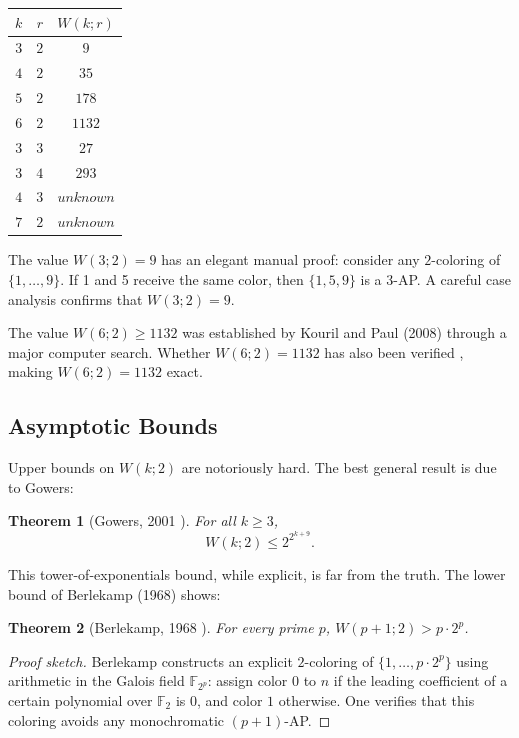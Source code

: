 \documentclass[12pt,a4paper]{amsart}
\newtheorem{theorem}{Theorem}[section]
\theoremstyle{definition}
\begin{document}
\begin{center}
\begin{tabular}{ccc}
\toprule
$k$ & $r$ & $W(k; r)$ \\
\midrule
$3$ & $2$ & $9$ \\
$4$ & $2$ & $35$ \\
$5$ & $2$ & $178$ \\
$6$ & $2$ & $1132$ \\
$3$ & $3$ & $27$ \\
$3$ & $4$ & $293$ \\
$4$ & $3$ & $unknown$ \\
$7$ & $2$ & $unknown$ \\
\bottomrule
\end{tabular}
\end{center}

The value $W(3;2)=9$ has an elegant manual proof: consider any $2$-coloring of
$\{1,\ldots,9\}$. If 1 and 5 receive the same color, then $\{1,5,9\}$ is a
$3$-AP. A careful case analysis confirms that $W(3;2) = 9$.

The value $W(6;2) \geq 1132$ was established by Kouril and Paul (2008) through a
major computer search. Whether $W(6;2) = 1132$ has also been verified
\cite{Kouril2008}, making $W(6;2) = 1132$ exact.

\subsection{Asymptotic Bounds}

Upper bounds on $W(k;2)$ are notoriously hard. The best general result is due to Gowers:

\begin{theorem}[Gowers, 2001 \cite{Gowers2001}]
For all $k \geq 3$,
\[
  W(k; 2) \leq 2^{2^{k+9}}.
\]
\end{theorem}

This tower-of-exponentials bound, while explicit, is far from the truth.
The lower bound of Berlekamp (1968) shows:

\begin{theorem}[Berlekamp, 1968 \cite{Berlekamp1968}]
For every prime $p$, $W(p+1; 2) > p \cdot 2^p$.
\end{theorem}

\begin{proof}[Proof sketch]
Berlekamp constructs an explicit $2$-coloring of $\{1, \ldots, p \cdot 2^p\}$ using
arithmetic in the Galois field $\mathbb{F}_{2^p}$: assign color $0$ to $n$ if the
leading coefficient of a certain polynomial over $\mathbb{F}_2$ is $0$, and color $1$
otherwise. One verifies that this coloring avoids any monochromatic $(p+1)$-AP.
\end{proof}
\end{document}
